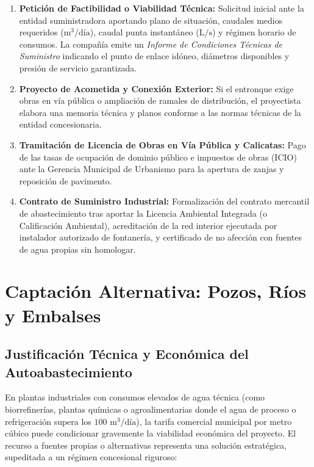 \documentclass{report}
\begin{document}
\begin{enumerate}
    \item \textbf{Petición de Factibilidad o Viabilidad Técnica:} Solicitud inicial ante la entidad suministradora aportando plano de situación, caudales medios requeridos ($\text{m}^3/\text{día}$), caudal punta instantáneo ($\text{L/s}$) y régimen horario de consumos. La compañía emite un \textit{Informe de Condiciones Técnicas de Suministro} indicando el punto de enlace idóneo, diámetros disponibles y presión de servicio garantizada.
    \item \textbf{Proyecto de Acometida y Conexión Exterior:} Si el entronque exige obras en vía pública o ampliación de ramales de distribución, el proyectista elabora una memoria técnica y planos conforme a las normas técnicas de la entidad concesionaria.
    \item \textbf{Tramitación de Licencia de Obras en Vía Pública y Calicatas:} Pago de las tasas de ocupación de dominio público e impuestos de obras (ICIO) ante la Gerencia Municipal de Urbanismo para la apertura de zanjas y reposición de pavimento.
    \item \textbf{Contrato de Suministro Industrial:} Formalización del contrato mercantil de abastecimiento tras aportar la Licencia Ambiental Integrada (o Calificación Ambiental), acreditación de la red interior ejecutada por instalador autorizado de fontanería, y certificado de no afección con fuentes de agua propias sin homologar.
\end{enumerate}

\chapter{Captación Alternativa: Pozos, Ríos y Embalses}

\section{Justificación Técnica y Económica del Autoabastecimiento}
En plantas industriales con consumos elevados de agua técnica (como biorrefinerías, plantas químicas o agroalimentarias donde el agua de proceso o refrigeración supera los $100\text{ m}^3/\text{día}$), la tarifa comercial municipal por metro cúbico puede condicionar gravemente la viabilidad económica del proyecto. El recurso a fuentes propias o alternativas representa una solución estratégica, supeditada a un régimen concesional riguroso:
\end{document}
